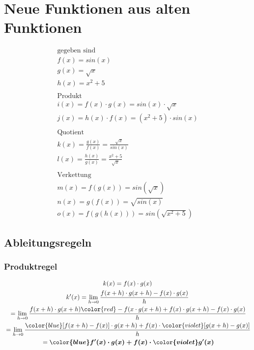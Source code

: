\section{Neue Funktionen aus alten Funktionen}
\begin{gather*}
  \text{gegeben sind} \\
  f(x) = sin(x) \\
  g(x) = \sqrt{x} \\
  h(x) = x^2 + 5 \\\\
  \text{Produkt} \\
  i(x) = f(x) \cdot g(x) = sin(x) \cdot \sqrt{x} \\
  j(x) = h(x) \cdot f(x) = (x^2 + 5) \cdot sin(x) \\\\
  \text{Quotient} \\
  k(x) = \frac{g(x)}{f(x)} = \frac{\sqrt{x}}{sin(x)} \\
  l(x) = \frac{h(x)}{g(x)} = \frac{x^2 + 5}{\sqrt{x}} \\\\
  \text{Verkettung} \\
  m(x) = f(g(x)) = sin(\sqrt{x}) \\
  n(x) = g(f(x)) = \sqrt{sin(x)} \\
  o(x) = f(g(h(x))) = sin(\sqrt{x^2 + 5})
\end{gather*}
\subsection{Ableitungsregeln}
\subsubsection{Produktregel}
\begin{gather*}
  k(x) = f(x) \cdot g(x) \\
  k'(x) = \lim\limits_{h \to 0} \frac{f(x + h) \cdot g(x + h) - f(x) \cdot g(x)}{h} \\
  \;= \lim\limits_{h \to 0} \frac{f(x + h) \cdot g(x + h) {\color{red}- f(x \cdot g(x + h) + f(x) \cdot g(x + h)} - f(x) \cdot g(x)}{h} \\
  \;= \lim\limits_{h \to 0} \frac{{\color{blue}[f(x + h) - f(x)]} \cdot g(x + h) + f(x) \cdot {\color{violet}[g(x + h) - g(x)]}}{h} \\
  \;= \boldsymbol{{\color{blue}f'(x)} \cdot g(x) + f(x) \cdot {\color{violet}g'(x)}}
\end{gather*}
